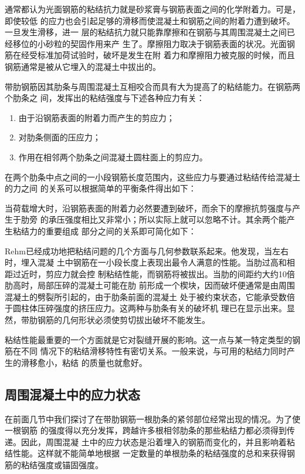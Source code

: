 \documentclass[12pt,a4paper]{book}
\begin{document}
通常都认为光面钢筋的粘结抗力就是砂浆膏与钢筋表面之间的化学附着力。可是，即使较低
的应力也会引起足够的滑移而使混凝土和钢筋之间的附着力遭到破坏。一旦发生滑移，进一
层的粘结抗力就只能靠摩擦和在钢筋与其周围混凝土之间已经移位的小砂粒的契固作用来产
生了。摩擦阻力取决于钢筋表面的状况。光面钢筋在经受标准加荷试验时，破坏是发生在附
着力和摩擦阻力被克服的时候，而且钢筋通常是被从它埋入的混凝土中拔出的。

带肋钢筋因其肋条与周围混凝土互相咬合而具有大为提高了的粘结能力。在钢筋两个肋条之
间，发挥出的粘结强度与下述各种应力有关：
\begin{enumerate}
\item 由于沿钢筋表面的附着力而产生的剪应力；
\item 对肋条侧面的压应力；
\item 作用在相邻两个肋条之间混凝土圆柱面上的剪应力。
\end{enumerate}

在两个肋条中点之间的一小段钢筋长度范围内，这些应力与要通过粘结传给混凝土的力之间
的关系可以根据简单的平衡条件得出如下：

当荷载增大时，沿钢筋表面的附着力必然要遭到破坏，而余下的摩擦抗剪强度与产生于肋旁
的承压强度相比又非常小；所以实际上就可以忽略不计。其余两个能产生粘结力的重要组成
部分之间的关系即可简化如下：

Rehm已经成功地把粘结问题的几个方面与几何参数联系起来。他发现，当左右时，埋入混凝
土中钢筋在一小段长度上表现出最令人满意的性能。当肋过高和相距过近时，剪应力就会控
制粘结性能，而钢筋将被拔出。当肋的间距约大约10倍肋高时，局部压碎的混凝土可能在肋
前形成一个楔块，因而破坏便通常是由周围混凝土的劈裂所引起的，由于肋条前面的混凝土
处于被约束状态，它能承受数倍于圆柱体压碎强度的挤压应力。这两种与肋条有关的破坏机
理已在显示出来。显然，带肋钢筋的几何形状必须使剪切拔出破坏不能发生。

粘结性能最重要的一个方面就是它对裂缝开展的影响。这一点与某一特定类型的钢筋在不同
情况下的粘结滑移特性有密切关系。一般来说，与可用的粘结力同时产生的滑移愈小，粘结
的质量也就愈好。

\subsection{周围混凝土中的应力状态}

在前面几节中我们探讨了在带肋钢筋一根肋条的紧邻部位经常出现的情况。为了使一根钢筋
的强度得以充分发挥，跨越许多根相邻肋条的那些粘结力都必须得到传递。因此，周围混凝
土中的应力状态是沿着埋入的钢筋而变化的，并且影响着粘结性能。这样就不能简单地根据
一定数量的单根肋条的粘结强度的总和来获得钢筋的粘结强度或锚固强度。
\end{document}
